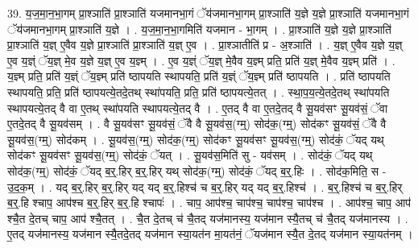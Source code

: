 \documentclass[17pt]{extarticle}
\begin{document}
39. य॒ज॒मा॒न॒भा॒गम् प्रा॒श्ञाति॑ प्रा॒श्ञाति॑ यजमानभा॒गं ॅय॑जमानभा॒गम् प्रा॒श्ञाति॑ य॒ज्ञे य॒ज्ञे प्रा॒श्ञाति॑ यजमानभा॒गं ॅय॑जमानभा॒गम् प्रा॒श्ञाति॑ य॒ज्ञे । . य॒ज॒मा॒न॒भा॒गमिति॑ यजमान - भा॒गम् । . प्रा॒श्ञाति॑ य॒ज्ञे य॒ज्ञे प्रा॒श्ञाति॑ प्रा॒श्ञाति॑ य॒ज्ञ् ए॒वैव य॒ज्ञे प्रा॒श्ञाति॑ प्रा॒श्ञाति॑ य॒ज्ञ् ए॒व । . प्रा॒श्ञातीति॑ प्र - अ॒श्ञाति॑ । . य॒ज्ञ् ए॒वैव य॒ज्ञे य॒ज्ञ् ए॒व य॒ज्ञ्ं ॅय॒ज्ञ् मे॒व य॒ज्ञे य॒ज्ञ् ए॒व य॒ज्ञ्म् । . ए॒व य॒ज्ञ्ं ॅय॒ज्ञ् मे॒वैव य॒ज्ञ्म् प्रति॒ प्रति॑ य॒ज्ञ् मे॒वैव य॒ज्ञ्म् प्रति॑ । . य॒ज्ञ्म् प्रति॒ प्रति॑ य॒ज्ञ्ं ॅय॒ज्ञ्म् प्रति॑ ष्ठापयति स्थापयति॒ प्रति॑ य॒ज्ञ्ं ॅय॒ज्ञ्म् प्रति॑ ष्ठापयति । . प्रति॑ ष्ठापयति स्थापयति॒ प्रति॒ प्रति॑ ष्ठापयत्ये॒तदे॒तथ् स्था॑पयति॒ प्रति॒ प्रति॑ ष्ठापयत्ये॒तत् । . स्था॒प॒य॒त्ये॒तदे॒तथ् स्था॑पयति स्थापयत्ये॒तद् वै वा ए॒तथ् स्था॑पयति स्थापयत्ये॒तद् वै । . ए॒तद् वै वा ए॒तदे॒तद् वै सू॒यव॑सꣳ सू॒यव॑सं॒ ॅवा ए॒तदे॒तद् वै सू॒यव॑सम् । . वै सू॒यव॑सꣳ सू॒यव॑सं॒ ॅवै वै सू॒यव॑स॒(ग्म्॒) सोद॑क॒(ग्म्॒) सोद॑कꣳ सू॒यव॑सं॒ ॅवै वै सू॒यव॑स॒(ग्म्॒) सोद॑कम् । . सू॒यव॑स॒(ग्म्॒) सोद॑क॒(ग्म्॒) सोद॑कꣳ सू॒यव॑सꣳ सू॒यव॑स॒(ग्म्॒) सोद॑कं॒ ॅयद् यथ् सोद॑कꣳ सू॒यव॑सꣳ सू॒यव॑स॒(ग्म्॒) सोद॑कं॒ ॅयत् । . सू॒यव॑स॒मिति॑ सु - यव॑सम् । . सोद॑कं॒ ॅयद् यथ् सोद॑क॒(ग्म्॒) सोद॑कं॒ ॅयद् ब॒र्॒.हिर् ब॒र्॒.हिर् यथ् सोद॑क॒(ग्म्॒) सोद॑कं॒ ॅयद् ब॒र्॒.हिः । . सोद॑क॒मिति॒ स - उ॒द॒क॒म् । . यद् ब॒र्॒.हिर् ब॒र्॒.हिर् यद् यद् ब॒र्॒.हिश्च॑ च ब॒र्॒.हिर् यद् यद् ब॒र्॒.हिश्च॑ । . ब॒र्॒.हिश्च॑ च ब॒र्॒.हिर् ब॒र्॒.हि श्चाप॒ आप॑श्च ब॒र्॒.हिर् ब॒र्॒.हि श्चापः॑ । . चाप॒ आप॑श्च॒ चाप॑श्च॒ चाप॑श्च॒ चाप॑श्च । . आप॑श्च॒ चाप॒ आप॑ श्चै॒त दे॒तच् चाप॒ आप॑ श्चै॒तत् । . चै॒त दे॒तच् च॑ चै॒तद् यज॑मानस्य॒ यज॑मान स्यै॒तच् च॑ चै॒तद् यज॑मानस्य । . ए॒तद् यज॑मानस्य॒ यज॑मान स्यै॒तदे॒तद् यज॑मान स्या॒यत॑न मा॒यत॑नं॒ ॅयज॑मान स्यै॒त दे॒तद् यज॑मान स्या॒यत॑नम् । \newline
\pagebreak
{}
\end{document}
